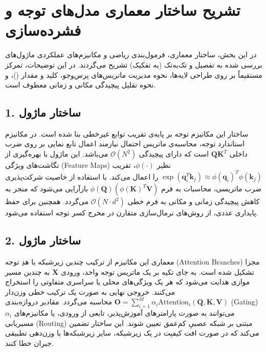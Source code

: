 \documentclass[12pt,a4paper]{report}
\begin{document}
\chapter*{تشریح ساختار معماری مدل‌های توجه و فشرده‌سازی}

در این بخش، ساختار معماری، فرمول‌بندی ریاضی و مکانیزم‌های عملکردی ماژول‌های بررسی شده به تفصیل و تک‌به‌تک (به تفکیک) تشریح می‌گردند. در این توضیحات، تمرکز مستقیماً بر روی طراحی لایه‌ها، نحوه مدیریت ماتریس‌های پرس‌وجو، کلید و مقدار ()، و نحوه تقلیل پیچیدگی مکانی و زمانی معطوف است.

\section*{1. ساختار ماژول }
ساختار این مکانیزم توجه بر پایه‌ی تقریب توابع غیرخطی بنا شده است. در مکانیزم استاندارد توجه، محاسبه‌ی ماتریس احتمال نیازمند اعمال تابع نمایی بر روی ضرب داخلی $\mathbf{Q} \mathbf{K}^T$ است که دارای پیچیدگی $\mathcal{O}(N^2)$ می‌باشد. این ماژول با بهره‌گیری از نگاشت‌های ویژگی (Feature Maps) نظیر $\phi(\cdot)$، تقریب $\exp(\mathbf{q}_i^T \mathbf{k}_j) \approx \phi(\mathbf{q}_i)^T \phi(\mathbf{k}_j)$ را اعمال می‌کند. با استفاده از خاصیت شرکت‌پذیری ضرب ماتریسی، محاسبات به فرم $\phi(\mathbf{Q}) (\phi(\mathbf{K})^T \mathbf{V})$ بازآرایی می‌شود که منجر به کاهش پیچیدگی زمانی و مکانی به فرم خطی $\mathcal{O}(N \cdot d^2)$ می‌گردد. همچنین برای حفظ پایداری عددی، از روش‌های نرمال‌سازی متقارن در مخرج کسر توجه استفاده می‌شود.

\section*{2. ساختار ماژول }
معماری این مکانیزم از ترکیب چندین زیرشبکه یا هدِ توجه (Attention Branches) مجزا تشکیل شده است. به جای تکیه بر یک ماتریس توجه واحد، ورودی $\mathbf{X}$ به چندین مسیر موازی هدایت می‌شود که هر یک ویژگی‌های محلی یا سراسری متفاوتی را استخراج می‌کنند. خروجی نهایی به صورت یک ترکیب خطی وزن‌دار $\mathbf{O} = \sum_{i=1}^{M} \alpha_i \mathrm{Attention}_i(\mathbf{Q}, \mathbf{K}, \mathbf{V})$ محاسبه می‌گردد. مقادیر دروازه‌بندی (Gating) $\alpha_i$ می‌توانند به صورت پارامترهای آموزش‌پذیر، تابعی از ورودی، یا مکانیزم‌های مسیریابی (Routing) مبتنی بر شبکه عصبیِ کم‌عمق تعیین شوند. این ساختار تضمین می‌کند که در صورت افت کیفیت در یک زیرشبکه، سایر زیرشبکه‌ها با وزن‌دهی تطبیقی جبران خطا کنند.
\end{document}
